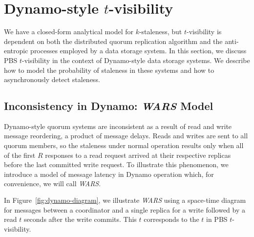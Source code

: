 \documentclass{vldb}
\newcommand{\sectionskip}{-0em}
\newcommand{\subsectionskip}{-0em}
\begin{document}
\vspace{\sectionskip}\section{Dynamo-style $t$-visibility}
\label{sec:dynamo}

We have a closed-form analytical model for $k$-staleness, but
$t$-visibility is dependent on both the distributed quorum replication
algorithm and the anti-entropic processes employed by a data storage
system.  In this section, we discuss PBS $t$-visibility in the context
of Dynamo-style data storage systems.  We describe how to model the
probability of staleness in these systems and how to asynchronously
detect staleness.

\vspace{\subsectionskip}\subsection{Inconsistency in Dynamo: {\large \textit{WARS}} Model}
\label{sec:wars}

Dynamo-style quorum systems are inconsistent as a result of read and
write message reordering, a product of message delays.  Reads and
writes are sent to all quorum members, so the staleness under normal
operation results only when all of the first $R$ responses to a read
request arrived at their respective replicas before the last committed
write request.  To illustrate this phenomenon, we introduce a model
of message latency in Dynamo operation which, for convenience, we will
call \textit{WARS}.

In Figure~\ref{fig:dynamo-diagram}, we illustrate \textit{WARS} using
a space-time diagram for messages between a coordinator and a single
replica for a write followed by a read $t$ seconds after the write
commits.  This $t$ corresponds to the $t$ in PBS $t$-visibility.
\end{document}
